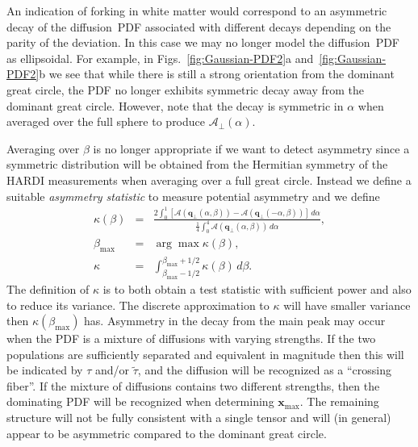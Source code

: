 \documentclass[dvips,aoas,preprint]{imsart}
\numberwithin{equation}{section}
\theoremstyle{plain}
\newcommand{\q}{\mathbf{q}}
\newcommand{\x}{\mathbf{x}}
\newcommand{\cA}{\mathcal{A}}
\begin{document}

An indication of forking in white matter would correspond to an
asymmetric decay of the diffusion~PDF associated with different decays
depending on the parity of the deviation.  In this case we may no
longer model the diffusion~PDF as ellipsoidal.  For example, in
Figs.~\ref{fig:Gaussian-PDF2}a and~\ref{fig:Gaussian-PDF2}b we see
that while there is still a strong orientation from the dominant great
circle, the PDF no longer exhibits symmetric decay away from the
dominant great circle.  However, note that the decay is symmetric in
$\alpha$ when averaged over the full sphere to produce
${\cA}_{\perp}(\alpha)$.

Averaging over $\beta$ is no longer appropriate if we want to detect
asymmetry since a symmetric distribution will be obtained from the
Hermitian symmetry of the HARDI measurements when averaging over a
full great circle.  Instead we define a suitable {\em asymmetry
statistic} to measure potential asymmetry and we define
\begin{eqnarray}
  \kappa(\beta) &=& \frac{2\int_{0}^{1}
    \left[\cA\left(\q_\perp(\alpha,\beta)\right) -
      \cA\left(\q_\perp(-\alpha,\beta)\right)\right] \, d\alpha}
        {\frac{1}{4} \int_{0}^{4}
          \cA\left(\q_\perp(\alpha,\beta)\right) \, d\alpha},\\
        \beta_\text{max} &=& \arg \max\kappa(\beta),\\
        \kappa &=& \int_{\beta_\text{max}-1/2}^{\beta_\text{max}+1/2}
        \kappa(\beta) \, d\beta.
\end{eqnarray}
The definition of $\kappa$ is to both obtain a test statistic with
sufficient power and also to reduce its variance.  The discrete
approximation to $\kappa$ will have smaller variance then
$\kappa(\beta_\text{max})$ has.  Asymmetry in the decay from the main
peak may occur when the PDF is a mixture of diffusions with varying
strengths.  If the two populations are sufficiently separated and
equivalent in magnitude then this will be indicated by $\tau$ and/or
$\tilde\tau$, and the diffusion will be recognized as a ``crossing
fiber''.  If the mixture of diffusions contains two different
strengths, then the dominating PDF will be recognized when determining
$\x_\text{max}$.  The remaining structure will not be fully consistent
with a single tensor and will (in general) appear to be asymmetric
compared to the dominant great circle.
\end{document}
